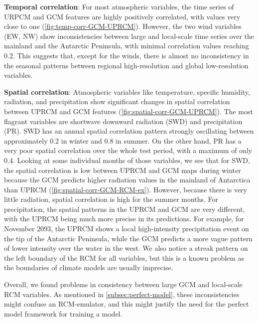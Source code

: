 \documentclass[a4paper,11pt,oneside]{report}
\begin{document}
\textbf{Temporal correlation}: For most atmospheric variables, the time series of URPCM and GCM features are highly positively correlated, with values very close to one (\autoref{fig:temp-corr-GCM-UPRCM}). However, the two wind variables (EW, NW) show inconsistencies between large and local-scale time series over the mainland and the Antarctic Peninsula, with minimal correlation values reaching 0.2. This suggests that, except for the winds, there is almost no inconsistency in the seasonal patterns between regional high-resolution and global low-resolution variables. 

\textbf{Spatial correlation}: Atmospheric variables like temperature, specific humidity, radiation, and precipitation show significant changes in spatial correlation between UPRCM and GCM features (\autoref{fig:spatial-corr-GCM-UPRCM}). The most flagrant variables are shortwave downward radiation (SWD) and precipitation (PR). SWD has an annual spatial correlation pattern strongly oscillating between approximately 0.2 in winter and 0.8 in summer. On the other hand, PR has a very poor spatial correlation over the whole test period, with a maximum of only 0.4. Looking at some individual months of those variables, we see that for SWD, the spatial correlation is low between UPRCM and GCM maps during winter because the GCM predicts higher radiation values in the mainland of Antarctica than UPRCM (\autoref{fig:spatial-corr-GCM-RCM-ex}). However, because there is very little radiation, spatial correlation is high for the summer months. For precipitation, the spatial patterns in the UPRCM and GCM are very different, with the UPRCM being much more precise in its predictions. For example, for November 2093, the UPRCM shows a local high-intensity precipitation event on the tip of the Antarctic Peninsula, while the GCM predicts a more vague pattern of lower intensity over the water in the west. We also notice a streak pattern on the left boundary of the RCM for all variables, but this is a known problem as the boundaries of climate models are usually imprecise. 

Overall, we found problems in consistency between large GCM and local-scale RCM variables. As mentioned in \autoref{subsec:perfect-model}, these inconsistencies might confuse an RCM-emulator, and this might justify the need for the perfect model framework for training a model. 
\end{document}
